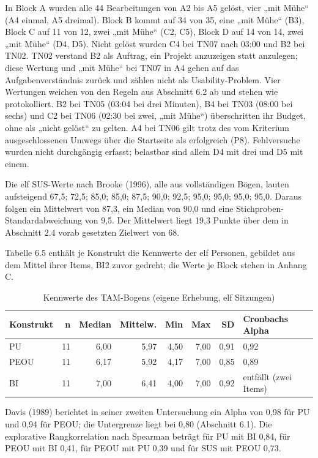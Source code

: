 In Block A wurden alle 44 Bearbeitungen von A2 bis A5 gelöst, vier „mit Mühe“ (A4 einmal, A5 dreimal). Block B kommt auf 34 von 35, eine „mit Mühe“ (B3), Block C auf 11 von 12, zwei „mit Mühe“ (C2, C5), Block D auf 14 von 14, zwei „mit Mühe“ (D4, D5). Nicht gelöst wurden C4 bei TN07 nach 03:00 und B2 bei TN02. TN02 verstand B2 als Auftrag, ein Projekt anzuzeigen statt anzulegen; diese Wertung und „mit Mühe“ bei TN07 in A4 gehen auf das Aufgabenverständnis zurück und zählen nicht als Usability-Problem. Vier Wertungen weichen von den Regeln aus Abschnitt 6.2 ab und stehen wie protokolliert. B2 bei TN05 (03:04 bei drei Minuten), B4 bei TN03 (08:00 bei sechs) und C2 bei TN06 (02:30 bei zwei, „mit Mühe“) überschritten ihr Budget, ohne als „nicht gelöst“ zu gelten. A4 bei TN06 gilt trotz des vom Kriterium ausgeschlossenen Umwegs über die Startseite als erfolgreich (P8). Fehlversuche wurden nicht durchgängig erfasst; belastbar sind allein D4 mit drei und D5 mit einem.

Die elf SUS-Werte nach Brooke (1996), alle aus vollständigen Bögen, lauten aufsteigend 67,5; 72,5; 85,0; 85,0; 87,5; 90,0; 92,5; 95,0; 95,0; 95,0; 95,0. Daraus folgen ein Mittelwert von 87,3, ein Median von 90,0 und eine Stichproben-Standardabweichung von 9,5. Der Mittelwert liegt 19,3 Punkte über dem in Abschnitt 2.4 vorab gesetzten Zielwert von 68.

Tabelle 6.5 enthält je Konstrukt die Kennwerte der elf Personen, gebildet aus dem Mittel ihrer Items, BI2 zuvor gedreht; die Werte je Block stehen in Anhang C.

\begin{table}[htbp]
	\centering
	\small
	\caption[Kennwerte des TAM-Bogens]{Kennwerte des TAM-Bogens (eigene Erhebung, elf Sitzungen)}
	\label{tab:tam-kennwerte}
	\begin{tabularx}{\textwidth}{@{}lrrrrrrY@{}}
		\toprule
		\textbf{Konstrukt} & \textbf{n} & \textbf{Median} & \textbf{Mittelw.} & \textbf{Min} & \textbf{Max} & \textbf{SD} & \textbf{Cronbachs Alpha} \\
		\midrule
		PU & 11 & 6,00 & 5,97 & 4,50 & 7,00 & 0,91 & 0,92 \\
		PEOU & 11 & 6,17 & 5,92 & 4,17 & 7,00 & 0,85 & 0,89 \\
		BI & 11 & 7,00 & 6,41 & 4,00 & 7,00 & 0,92 & entfällt (zwei Items) \\
		\bottomrule
	\end{tabularx}
\end{table}

Davis (1989) berichtet in seiner zweiten Untersuchung ein Alpha von 0,98 für PU und 0,94 für PEOU; die Untergrenze liegt bei 0,80 (Abschnitt 6.1). Die explorative Rangkorrelation nach Spearman beträgt für PU mit BI 0,84, für PEOU mit BI 0,41, für PEOU mit PU 0,39 und für SUS mit PEOU 0,73.

